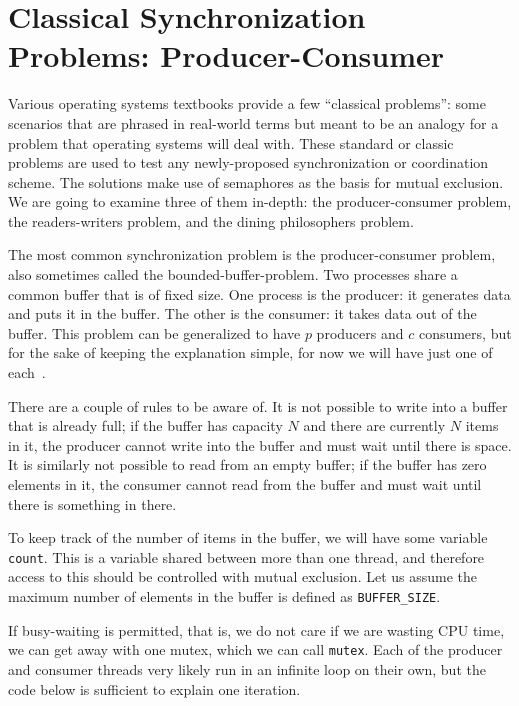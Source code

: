 




\section*{Classical Synchronization Problems: Producer-Consumer}

Various operating systems textbooks provide a few ``classical problems'': some scenarios that are phrased in real-world terms but meant to be an analogy for a problem that operating systems will deal with. These standard or classic problems are used to test any newly-proposed synchronization or coordination scheme. The solutions make use of semaphores as the basis for mutual exclusion. We are going to examine three of them in-depth: the producer-consumer problem, the readers-writers problem, and the dining philosophers problem.

The most common synchronization problem is the producer-consumer problem, also sometimes called the bounded-buffer-problem. Two processes share a common buffer that is of fixed size. One process is the producer: it generates data and puts it in the buffer. The other is the consumer: it takes data out of the buffer. This problem can be generalized to have $p$ producers and $c$ consumers, but for the sake of keeping the explanation simple, for now we will have just one of each~\cite{mos}.

There are a couple of rules to be aware of. It is not possible to write into a buffer that is already full; if the buffer has capacity $N$ and there are currently $N$ items in it, the producer cannot write into the buffer and must wait until there is space. It is similarly not possible to read from an empty buffer; if the buffer has zero elements in it, the consumer cannot read from the buffer and must wait until there is something in there.

To keep track of the number of items in the buffer, we will have some variable \texttt{count}. This is a variable shared between more than one thread, and therefore access to this should be controlled with mutual exclusion. Let us assume the maximum number of elements in the buffer is defined as \texttt{BUFFER\_SIZE}.

If busy-waiting is permitted, that is, we do not care if we are wasting CPU time, we can get away with one mutex, which we can call \texttt{mutex}. Each of the producer and consumer threads very likely run in an infinite loop on their own, but the code below is sufficient to explain one iteration.

